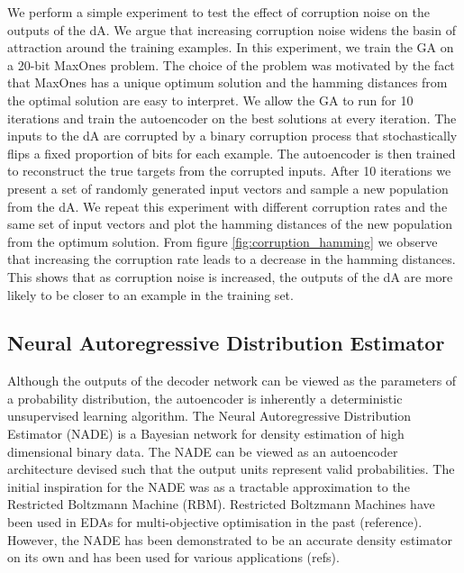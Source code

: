 \documentclass[twoside]{article}
\begin{document}
We perform a simple experiment to test the effect of corruption noise on the outputs of the dA. We argue that increasing corruption noise widens the basin of attraction around the training examples. In this experiment, we train the GA on a 20-bit MaxOnes problem. The choice of the problem was motivated by the fact that MaxOnes has a unique optimum solution and the hamming distances from the optimal solution are easy to interpret. We allow the GA to run for 10 iterations and train the autoencoder on the best solutions at every iteration. The inputs to the dA are corrupted by a binary corruption process that stochastically flips a fixed proportion of bits for each example. The autoencoder is then trained to reconstruct the true targets from the corrupted inputs. After 10 iterations we present a set of randomly generated input vectors and sample a new population from the dA. We repeat this experiment with different corruption rates and the same set of input vectors and  plot the hamming distances of the new population from the optimum solution. From figure \ref{fig:corruption_hamming} we observe that increasing the corruption rate leads to a decrease in the hamming distances. This shows that as corruption noise is increased, the outputs of the dA are more likely to be closer to an example in the training set.

\subsection{Neural Autoregressive Distribution Estimator}

Although the outputs of the decoder network can be viewed as the parameters of a probability distribution, the autoencoder is inherently a deterministic unsupervised learning algorithm. The Neural Autoregressive Distribution Estimator (NADE) is a Bayesian network for density estimation of high dimensional binary data. The NADE can be viewed as an autoencoder architecture devised such that the output units represent valid probabilities. The initial inspiration for the NADE was as a tractable approximation to the Restricted Boltzmann Machine (RBM). Restricted Boltzmann Machines have been used in EDAs for multi-objective optimisation in the past (reference). However, the NADE has been demonstrated to be an accurate density estimator on its own and has been used for various applications (refs). 
\end{document}
